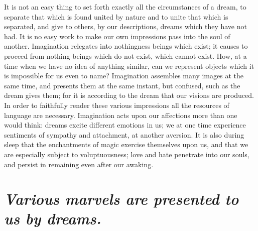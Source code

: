 \documentclass[12pt]{article}
\begin{document}
It is not an easy thing to set forth exactly all the circumstances of a dream,
to separate that which is found united by nature and to unite that which is
separated, and give to others, by our descriptions, dreams which they have not
had. It is no easy work to make our own impressions pass into the soul of
another. Imagination relegates into nothingness beings which exist; it causes
to proceed from nothing beings which do not exist, which cannot exist. How, at
a time when we have no idea of anything similar, can we represent objects which
it is impossible for us even to name? Imagination assembles many images at the
same time, and presents them at the same instant, but confused, such as the
dream gives them; for it is according to the dream that our visions are
produced. In order to faithfully render these various impressions all the
resources of language are necessary. Imagination acts upon our affections more
than one would think: dreams excite different emotions in us; we at one time
experience sentiments of sympathy and attachment, at another aversion. It is
also during sleep that the enchantments of magic exercise themselves upon us,
and that we are especially subject to voluptuousness; love and hate penetrate
into our souls, and persist in remaining even after our awaking.


\section{\mdseries\itshape Various marvels are presented to us by dreams.}
\end{document}
